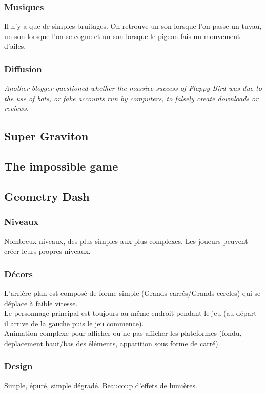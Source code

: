 \documentclass{article}
\begin{document}
\subsubsection{Musiques}
Il n'y a que de simples bruitages. On retrouve un son lorsque l'on passe un tuyau, un son lorsque l'on se cogne et un son lorsque le pigeon fais un mouvement d'ailes.

\subsubsection{Diffusion}
\textit{Another blogger questioned whether the massive success of Flappy Bird was due to the use of bots, or fake accounts run by computers, to falsely create downloads or reviews.}

\subsection{Super Graviton}
\subsection{The impossible game}
\subsection{Geometry Dash}

\subsubsection{Niveaux}
Nombreux niveaux, des plus simples aux plus complexes. Les joueurs peuvent créer leurs propres niveaux. 

\subsubsection{Décors}
L'arrière plan est composé de forme simple (Grands carrés/Grands cercles) qui se déplace à faible vitesse.\\
Le personnage principal est toujours au même endroit pendant le jeu (au départ il arrive de la gauche puis le jeu commence).\\
Animation complexe pour afficher ou ne pas afficher les plateformes (fondu, deplacement haut/bas des éléments, apparition sous forme de carré).

\subsubsection{Design}
Simple, épuré, simple dégradé. Beaucoup d'effets de lumières.
\end{document}
